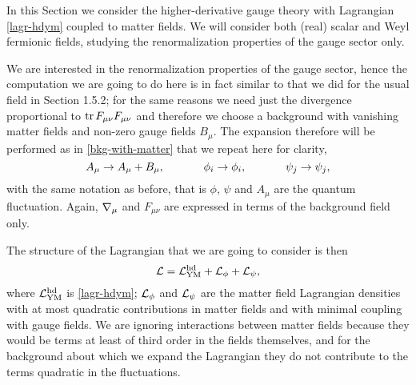In this Section we consider the higher-derivative gauge theory with Lagrangian \eqref{lagr-hdym} coupled to matter fields. We will consider both (real) scalar and Weyl fermionic fields, studying the renormalization properties of the gauge sector only.

We are interested in the renormalization properties of the gauge sector, hence the computation we are going to do here is in fact similar to that we did for the usual \ym{} field in Section 1.5.2; for the same reasons we need just the divergence proportional to $\operatorname{tr} F_{ \mu \nu } F_{ \mu \nu } $  and therefore we choose a background with vanishing matter fields and non-zero gauge fields $B_\mu$. The expansion therefore will be performed as in \eqref{bkg-with-matter} that we repeat here for clarity, 
\begin{equation}
A_\mu \rightarrow A_\mu + B_\mu, 
\hspace{3.5em} 
\phi_i \rightarrow \phi_i,
\hspace{3.5em}
\psi_j \rightarrow \psi_j,
\end{equation}
with the same notation as before, that is $\phi$, $\psi$ and $A_\mu$ are the quantum fluctuation. Again, ${ \mathcal{\nabla} }_\mu$ and $F_{\mu\nu}$ are expressed in terms of the background field only.







The structure of the Lagrangian that we are going to consider is then
\begin{equation}
{ \mathcal{L} } =
	{ \mathcal{L} }_{{ \text{YM} }}^{ \text{hd} } + { \mathcal{L} }_\phi + { \mathcal{L} }_\psi,
\end{equation}
where \({ \mathcal{L} }_{{ \text{YM} }}^{ \text{hd} }\) is \eqref{lagr-hdym}; \( { \mathcal{L} }_\phi \) and \( { \mathcal{L} }_\psi \) are the matter field Lagrangian densities with at most quadratic contributions in matter fields and with minimal coupling with gauge fields.
We are ignoring interactions between matter fields because they would be terms at least of third order in the fields themselves, and for the background about which we expand the Lagrangian they do not contribute to the terms quadratic in the fluctuations.


